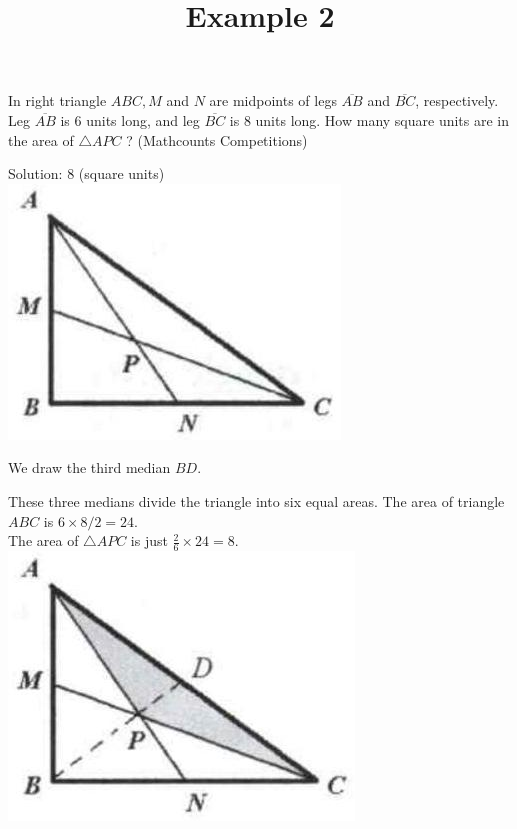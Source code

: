 \documentclass{article}
\title{Example 2}
\date{}
\begin{document}
\maketitle

In right triangle \(A B C, M\) and \(N\) are midpoints of legs \(\overline{A B}\) and \(\overline{B C}\), respectively. Leg \(\overline{A B}\) is 6 units long, and leg \(\overline{B C}\) is 8 units long. How many square units are in the area of \(\triangle A P C\) ? (Mathcounts Competitions)

Solution: 8 (square units)\\
\centering
\includegraphics[width=\textwidth]{images/problem_image_1.jpg}

We draw the third median \(B D\).

These three medians divide the triangle into six equal areas. The area of triangle \(A B C\) is \(6 \times 8 / 2=24\).\\
The area of \(\triangle A P C\) is just \(\frac{2}{6} \times 24=8\).\\
\centering
\includegraphics[width=\textwidth]{images/reasoning_image_1.jpg}
\end{document}
